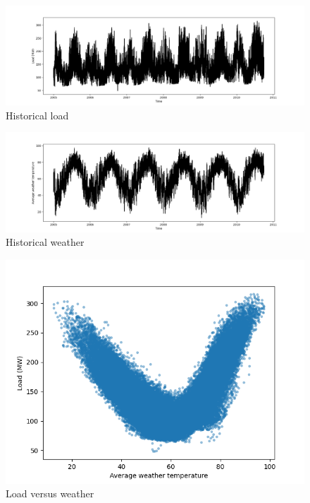 \begin{figure}[!h]
    \includegraphics[width=\textwidth]{images/gefcom_load_historical.png}
    \caption{Historical load}
    \label{fig:gefcom_load_historical}
\end{figure}

\begin{figure}[!h]
    \includegraphics[width=\textwidth]{images/gefcom_w_avg_historical.png}
    \caption{Historical weather}
    \label{fig:gefcom_w_avg_historical}
\end{figure}

\begin{figure}[!h]
    \includegraphics[width=\textwidth]{images/gefcom_load_vs_w_avg.png}
    \caption{Load versus weather}
    \label{fig:gefcom_load_vs_w_avg}
\end{figure}

